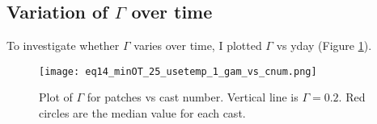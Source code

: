 \documentclass[11pt]{article}
\begin{document}
%
%




\clearpage
\subsection{Variation of $\Gamma$ over time}

To investigate whether $\Gamma$ varies over time, I plotted $\Gamma$ vs yday (Figure \ref{gamvscnum}).%

\begin{figure}[htbp]
\texttt{[image: eq14\_minOT\_25\_usetemp\_1\_gam\_vs\_cnum.png]}
\caption{Plot of $\Gamma$ for patches vs cast number. Vertical line is $\Gamma=0.2$. Red circles are the median value for each cast.}
\label{gamvscnum}
\end{figure}
\end{document}
